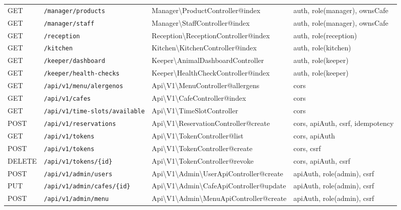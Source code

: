 \documentclass[12pt,a4paper,twoside,openright]{report}
\begin{document}
\begin{landscape}
\begin{longtable}{@{}llll@{}}
  GET  & \texttt{/manager/products}    & Manager\textbackslash ProductController@index      & auth, role(manager), ownsCafe\\
  GET  & \texttt{/manager/staff}       & Manager\textbackslash StaffController@index        & auth, role(manager), ownsCafe\\
  GET  & \texttt{/reception}           & Reception\textbackslash ReceptionController@index  & auth, role(reception)\\
  GET  & \texttt{/kitchen}             & Kitchen\textbackslash KitchenController@index      & auth, role(kitchen)\\
  GET  & \texttt{/keeper/dashboard}    & Keeper\textbackslash AnimalDashboardController     & auth, role(keeper)\\
  GET  & \texttt{/keeper/health-checks}& Keeper\textbackslash HealthCheckController@index  & auth, role(keeper)\\
  GET  & \texttt{/api/v1/menu/alergenos}& Api\textbackslash V1\textbackslash MenuController@allergens & cors\\
  GET  & \texttt{/api/v1/cafes}        & Api\textbackslash V1\textbackslash CafeController@index    & cors\\
  GET  & \texttt{/api/v1/time-slots/available}& Api\textbackslash V1\textbackslash TimeSlotController & cors\\
  POST & \texttt{/api/v1/reservations} & Api\textbackslash V1\textbackslash ReservationController@create & cors, apiAuth, csrf, idempotency\\
  GET  & \texttt{/api/v1/tokens}       & Api\textbackslash V1\textbackslash TokenController@list        & cors, apiAuth\\
  POST & \texttt{/api/v1/tokens}       & Api\textbackslash V1\textbackslash TokenController@create      & cors, csrf\\
  DELETE& \texttt{/api/v1/tokens/\{id\}}& Api\textbackslash V1\textbackslash TokenController@revoke     & cors, apiAuth, csrf\\
  POST & \texttt{/api/v1/admin/users}  & Api\textbackslash V1\textbackslash Admin\textbackslash UserApiController@create & apiAuth, role(admin), csrf\\
  PUT  & \texttt{/api/v1/admin/cafes/\{id\}}& Api\textbackslash V1\textbackslash Admin\textbackslash CafeApiController@update & apiAuth, role(admin), csrf\\
  POST & \texttt{/api/v1/admin/menu}   & Api\textbackslash V1\textbackslash Admin\textbackslash MenuApiController@create & apiAuth, role(admin), csrf\\

\end{longtable}
\end{landscape}
\end{document}

